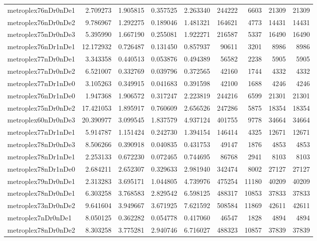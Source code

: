 \begin{longtable}{|l|r|r|r|r|r|r|r|r|}
metroplex76nDr0nDe1 & 2.709273 & 1.905815 & 0.357525 & 2.263340 & 244222 & 6603 & 21309 & 21309 \\
metroplex76nDr0nDe2 & 9.786967 & 1.292275 & 0.189046 & 1.481321 & 164621 & 4773 & 14431 & 14431 \\
metroplex75nDr0nDe3 & 5.395990 & 1.667190 & 0.255081 & 1.922271 & 216587 & 5337 & 16490 & 16490 \\
metroplex76nDr1nDe1 & 12.172932 & 0.726487 & 0.131450 & 0.857937 & 90611 & 3201 & 8986 & 8986 \\
metroplex77nDr0nDe1 & 3.343358 & 0.440513 & 0.053876 & 0.494389 & 56582 & 2238 & 5905 & 5905 \\
metroplex77nDr0nDe2 & 6.521007 & 0.332769 & 0.039796 & 0.372565 & 42160 & 1744 & 4332 & 4332 \\
metroplex77nDr1nDe0 & 3.105263 & 0.349915 & 0.041683 & 0.391598 & 42100 & 1688 & 4246 & 4246 \\
metroplex76nDr1nDe0 & 1.947368 & 1.906572 & 0.317247 & 2.223819 & 244216 & 6599 & 21301 & 21301 \\
metroplex75nDr0nDe2 & 17.421053 & 1.895917 & 0.760609 & 2.656526 & 247286 & 5875 & 18354 & 18354 \\
metroplex60nDr0nDe3 & 20.390977 & 3.099545 & 1.837579 & 4.937124 & 401755 & 9778 & 34664 & 34664 \\
metroplex77nDr1nDe1 & 5.914787 & 1.151424 & 0.242730 & 1.394154 & 146414 & 4325 & 12671 & 12671 \\
metroplex78nDr0nDe3 & 8.506266 & 0.390918 & 0.040835 & 0.431753 & 49147 & 1876 & 4853 & 4853 \\
metroplex78nDr1nDe1 & 2.253133 & 0.672230 & 0.072465 & 0.744695 & 86768 & 2941 & 8103 & 8103 \\
metroplex78nDr1nDe0 & 2.684211 & 2.652307 & 0.329633 & 2.981940 & 342474 & 8002 & 27127 & 27127 \\
metroplex79nDr0nDe1 & 2.313283 & 3.695171 & 1.044805 & 4.739976 & 475254 & 11180 & 40209 & 40209 \\
metroplex78nDr0nDe1 & 6.303258 & 3.768583 & 2.829542 & 6.598125 & 488317 & 10853 & 37833 & 37833 \\
metroplex73nDr0nDe2 & 9.641604 & 3.949667 & 3.671925 & 7.621592 & 508584 & 11869 & 42611 & 42611 \\
metroplex7nDr0nDe1 & 8.050125 & 0.362282 & 0.054778 & 0.417060 & 46547 & 1828 & 4894 & 4894 \\
metroplex78nDr0nDe2 & 8.303258 & 3.775281 & 2.940746 & 6.716027 & 488323 & 10857 & 37839 & 37839 \\

\end{longtable}
